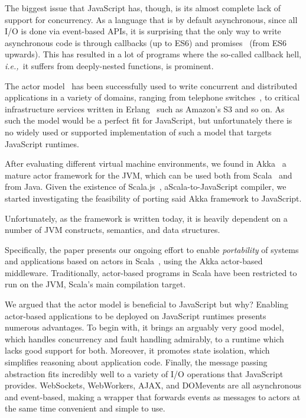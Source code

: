 \documentclass{sig-alternate}
\newcommand{\ie}{{\em i.e.,~}}
\begin{document}
The biggest issue that JavaScript has, though, is its almost complete lack of support for concurrency. As a language that is by default asynchronous, since all I/O is done via event-based APIs, it is surprising that the only way to write asynchronous code is through callbacks (up to ES6) and promises~\cite{LiskovS88} (from ES6 upwards). This has resulted in a lot of programs where the so-called callback hell, \ie it suffers from deeply-nested functions, is prominent.

The actor model~\cite{Hewitt77,Agha} has been successfully used to write concurrent and distributed applications in a variety of domains, ranging from telephone switches~\cite{ErlangApplications}, to critical infrastructure services written in Erlang~\cite{Armstrong10} such as Amazon's S3 and so on. As such the model would be a perfect fit for JavaScript, but unfortunately there is no widely used or supported implementation of such a model that targets JavaScript runtimes.

After evaluating different virtual machine environments, we found in Akka~\cite{Akka} a mature actor framework for the JVM\cite{Lindholm-Yellin}, which can be used both from Scala~\cite{OderskyR14} and from Java. Given the existence of Scala.js~\cite{Scalajs}, a\newline Scala-to-JavaScript compiler, we started investigating the feasibility of porting said Akka framework to JavaScript.

Unfortunately, as the framework is written today, it is heavily dependent on a number of JVM constructs, semantics, and data structures. %

Specifically, the paper presents our ongoing effort to enable {\em portability} of systems and applications based on actors in Scala~\cite{ActorsInScala}, using the Akka actor-based middleware. Traditionally, actor-based programs in Scala have been restricted to run on the JVM, Scala's main compilation target. %

We argued that the actor model is beneficial to JavaScript but why? Enabling actor-based applications to be deployed on JavaScript runtimes presents numerous advantages. To begin with, it brings an arguably very good model, which handles concurrency and fault handling admirably, to a runtime which lacks good support for both. Moreover, it promotes state isolation, which simplifies reasoning about application code. Finally, the message passing abstraction fits incredibly well to a variety of I/O operations that JavaScript provides. WebSockets, WebWorkers, AJAX, and DOM\newline events are all asynchronous and event-based, making a wrapper that forwards events as messages to actors at the same time convenient and simple to use.
\end{document}
